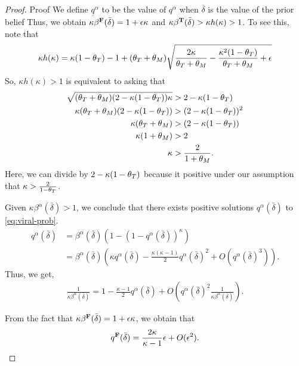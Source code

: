 \begin{proof}{Proof}
We define $\underline{q}^{\alpha}$ to be the value of $q^\alpha$ when $\overline{\delta}$ is the value of the prior belief Thus, we obtain $\kappa \beta^\false(\bar{\delta}) = 1 + \epsilon \kappa$ and $\kappa \beta^\true(\bar{\delta}) > \kappa h(\kappa) > 1$. To see this, note that 
\begin{align*}
    \kappa h(\kappa) = \kappa (1- \tt) - 1 + (\tt+\tm) \sqrt{\frac{2 \kappa}{\tt + \tm} - \frac{\kappa^2 (1-\tt)}{\tt + \tm} + \epsilon  } 
\end{align*}
So, $\kappa h(\kappa) > 1$ is equivalent to asking that 
\begin{align*}
    \sqrt{(\tt+\tm) (2 - \kappa ( 1- \tt)) \kappa} &> 2 - \kappa ( 1- \tt) \\ 
    \kappa (\tt+\tm) (2-\kappa ( 1- \tt)) &> (2 - \kappa ( 1- \tt))^2 \\ 
    \kappa (\tt + \tm) &> (2 - \kappa (1-\tt)) \\
    \kappa ( 1 + \tm) &> 2 \\ 
    \kappa &> \frac{2}{1+\tm}.
\end{align*}
Here, we can divide by $2 - \kappa ( 1- \tt) $ because it positive under our assumption that $\kappa > \frac{2}{1-\tt}$. 


Given $\kappa \beta^\alpha(\bar{\delta}) > 1$, we conclude that there exists positive solutions $q^\alpha(\bar{\delta})$ to \eqref{eq:viral-prob}.
\begin{align*}
q^\alpha(\bar{\delta}) &= \beta^\alpha(\bar{\delta}) \left( 1 - (1 - q^\alpha(\bar{\delta}))^\kappa \right) \\   
&= \beta^\alpha(\bar{\delta}) \left(  \kappa  q^\alpha(\bar{\delta}) - \frac{\kappa (\kappa -1)}{2} q^\alpha(\bar{\delta})^2  + O(q^\alpha(\bar{\delta})^3)\right).
\end{align*}
Thus, we get,  
\begin{align*}
    \frac{1}{\kappa \beta^\alpha (\bar{\delta})} =  1 - \frac{\kappa-1}{2} q^\alpha(\bar{\delta}) + O\left(q^\alpha(\bar{\delta})^2  \frac{1}{\kappa \beta^\alpha (\bar{\delta})}\right).
\end{align*}

From the fact that $\kappa \beta^\false(\bar{\delta}) = 1 + \epsilon \kappa$, we obtain that 
\begin{align*}
    q^\false(\bar{\delta})  = \frac{2\kappa }{\kappa -1 }  \epsilon  + O(\epsilon^2).
\end{align*}



\end{proof}
